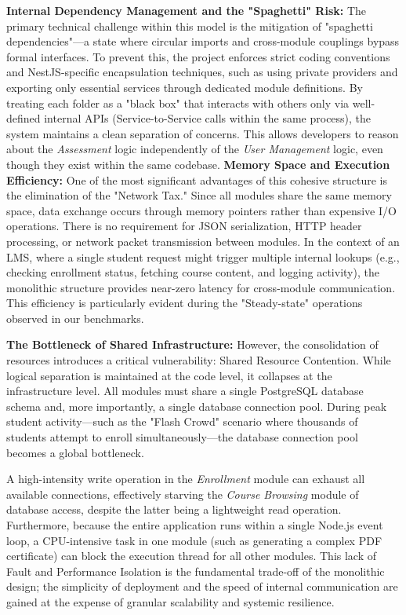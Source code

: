 \textbf{Internal Dependency Management and the "Spaghetti" Risk:}
The primary technical challenge within this model is the mitigation of "spaghetti dependencies"—a state where circular imports and cross-module couplings bypass formal interfaces. To prevent this, the project enforces strict coding conventions and NestJS-specific encapsulation techniques, such as using private providers and exporting only essential services through dedicated module definitions. By treating each folder as a "black box" that interacts with others only via well-defined internal APIs (Service-to-Service calls within the same process), the system maintains a clean separation of concerns. This allows developers to reason about the \textit{Assessment} logic independently of the \textit{User Management} logic, even though they exist within the same codebase.
\textbf{Memory Space and Execution Efficiency:}
One of the most significant advantages of this cohesive structure is the elimination of the "Network Tax." Since all modules share the same memory space, data exchange occurs through memory pointers rather than expensive I/O operations. There is no requirement for JSON serialization, HTTP header processing, or network packet transmission between modules. In the context of an LMS, where a single student request might trigger multiple internal lookups (e.g., checking enrollment status, fetching course content, and logging activity), the monolithic structure provides near-zero latency for cross-module communication. This efficiency is particularly evident during the "Steady-state" operations observed in our benchmarks.

\textbf{The Bottleneck of Shared Infrastructure:}
However, the consolidation of resources introduces a critical vulnerability: Shared Resource Contention. While logical separation is maintained at the code level, it collapses at the infrastructure level. All modules must share a single PostgreSQL database schema and, more importantly, a single database connection pool. During peak student activity—such as the "Flash Crowd" scenario where thousands of students attempt to enroll simultaneously—the database connection pool becomes a global bottleneck.

A high-intensity write operation in the \textit{Enrollment} module can exhaust all available connections, effectively starving the \textit{Course Browsing} module of database access, despite the latter being a lightweight read operation. Furthermore, because the entire application runs within a single Node.js event loop, a CPU-intensive task in one module (such as generating a complex PDF certificate) can block the execution thread for all other modules. This lack of Fault and Performance Isolation is the fundamental trade-off of the monolithic design; the simplicity of deployment and the speed of internal communication are gained at the expense of granular scalability and systemic resilience.

